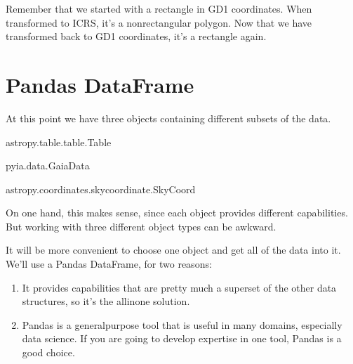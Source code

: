\documentclass[letterpaper,10pt,english]{sphinxmanual}
\begin{document}
\noindent{}

Remember that we started with a rectangle in GD\sphinxhyphen{}1 coordinates.  When transformed to ICRS, it’s a non\sphinxhyphen{}rectangular polygon.  Now that we have transformed back to GD\sphinxhyphen{}1 coordinates, it’s a rectangle again.


\section{Pandas DataFrame}
\label{\detokenize{03_motion:pandas-dataframe}}
At this point we have three objects containing different subsets of the data.

\begin{sphinxVerbatim}[commandchars=\\\{\}]
\end{sphinxVerbatim}

\begin{sphinxVerbatim}[commandchars=\\\{\}]
astropy.table.table.Table
\end{sphinxVerbatim}

\begin{sphinxVerbatim}[commandchars=\\\{\}]
\end{sphinxVerbatim}

\begin{sphinxVerbatim}[commandchars=\\\{\}]
pyia.data.GaiaData
\end{sphinxVerbatim}

\begin{sphinxVerbatim}[commandchars=\\\{\}]
\end{sphinxVerbatim}

\begin{sphinxVerbatim}[commandchars=\\\{\}]
astropy.coordinates.sky\PYGZus{}coordinate.SkyCoord
\end{sphinxVerbatim}

On one hand, this makes sense, since each object provides different capabilities.  But working with three different object types can be awkward.

It will be more convenient to choose one object and get all of the data into it.  We’ll use a Pandas DataFrame, for two reasons:
\begin{enumerate}
%
\item {} 
It provides capabilities that are pretty much a superset of the other data structures, so it’s the all\sphinxhyphen{}in\sphinxhyphen{}one solution.

\item {} 
Pandas is a general\sphinxhyphen{}purpose tool that is useful in many domains, especially data science.  If you are going to develop expertise in one tool, Pandas is a good choice.

\end{enumerate}
\end{document}
